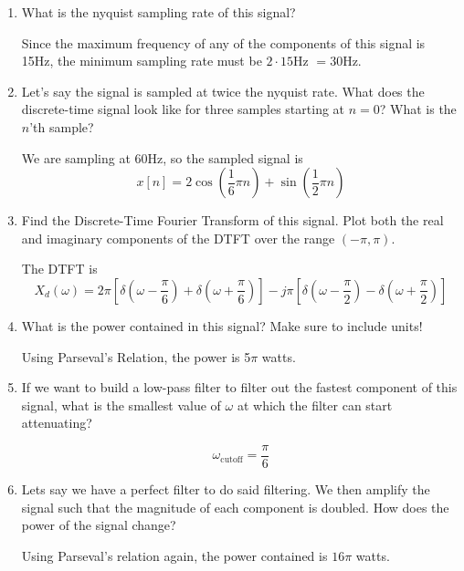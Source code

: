 \documentclass{article}
\begin{document}
\begin{enumerate}
    \item What is the nyquist sampling rate of this signal?
    
    Since the maximum frequency of any of the components of this signal is 15Hz, the minimum sampling rate must be $2\cdot 15$Hz $= 30$Hz.

    \item Let's say the signal is sampled at twice the nyquist rate. What does the discrete-time signal look like for three samples starting at $n=0$? What is the $n$'th sample?

    We are sampling at $60$Hz, so the sampled signal is
    $$x[n] = 2\cos\left( \frac{1}{6}\pi n \right) + \sin\left( \frac{1}{2}\pi n \right)$$
   
    \item Find the Discrete-Time Fourier Transform of this signal. Plot both the real and imaginary components of the DTFT over the range $(-\pi, \pi)$.

    The DTFT is
    $$X_{d}(\omega) = 2\pi \left[ \delta\left(\omega - \frac{\pi}{6}\right) + \delta\left(\omega + \frac{\pi}{6}\right) \right] - j \pi \left[ \delta\left(\omega - \frac{\pi}{2}\right) - \delta\left(\omega + \frac{\pi}{2}\right) \right]$$

    \item What is the power contained in this signal? Make sure to include units!

    Using Parseval's Relation, the power is 5$\pi$ watts.

    \item If we want to build a low-pass filter to filter out the fastest component of this signal, what is the smallest value of $\omega$ at which the filter can start attenuating? 

    $$\omega_\text{cutoff} = \frac{\pi}{6}$$

    \item Lets say we have a perfect filter to do said filtering. We then amplify the signal such that the magnitude of each component is doubled. How does the power of the signal change?

    Using Parseval's relation again, the power contained is $16\pi$ watts.
    
\end{enumerate}
\end{document}
